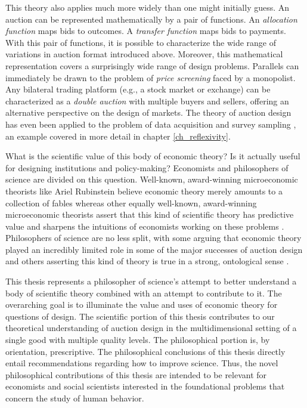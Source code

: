 This theory also applies much more widely than one might initially guess. An auction can be represented mathematically by a pair of functions. An \textit{allocation function} maps bids to outcomes. A \textit{transfer function} maps bids to payments. With this pair of functions, it is possible to characterize the wide range of variations in auction format introduced above. Moreover, this mathematical representation covers a surprisingly wide range of design problems. Parallels can immediately be drawn to the problem of \textit{price screening} faced by a monopolist. Any bilateral trading platform (e.g., a stock market or exchange) can be characterized as a \textit{double auction} with multiple buyers and sellers, offering an alternative perspective on the design of markets. The theory of auction design has even been applied to the problem of data acquisition and survey sampling \autocite{roth2012surveys}, an example covered in more detail in chapter \ref{ch_reflexivity}.

What is the scientific value of this body of economic theory? Is it actually useful for designing institutions and policy-making? Economists and philosophers of science are divided on this question. Well-known, award-winning microeconomic theorists like Ariel Rubinstein believe economic theory merely amounts to a collection of fables \autocite{rubinstein2012} whereas other equally well-known, award-winning microeconomic theorists assert that this kind of scientific theory has predictive value and sharpens the intuitions of economists working on these problems \autocite{roth2019}. Philosophers of science are no less split, with some arguing that economic theory played an incredibly limited role in some of the major successes of auction design \autocite{nikkhah2008} and others asserting this kind of theory is true in a strong, ontological sense \autocite{ross2008}.

This thesis represents a philosopher of science's attempt to better understand a body of scientific theory combined with an attempt to contribute to it. The overarching goal is to illuminate the value and uses of economic theory for questions of design. The scientific portion of this thesis contributes to our theoretical understanding of auction design in the multidimensional setting of a single good with multiple quality levels. The philosophical portion is, by orientation, prescriptive. The philosophical conclusions of this thesis directly entail recommendations regarding how to improve science. Thus, the novel philosophical contributions of this thesis are intended to be relevant for economists and social scientists interested in the foundational problems that concern the study of human behavior.





